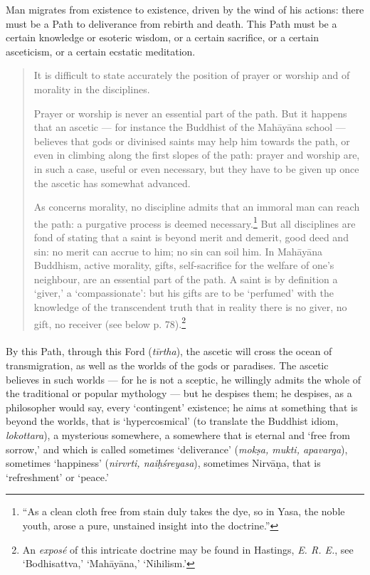 \documentclass[a4paper, 11pt, oneside, english]{article}
\begin{document}
Man migrates from existence to existence, driven by the wind of his actions: there must be a Path to deliverance from rebirth and death. This Path must be a certain knowledge or esoteric wisdom, or a certain sacrifice, or a certain asceticism, or a certain ecstatic meditation.
\begin{quotation}
\small
It is difficult to state accurately the position of prayer or worship and of morality in the disciplines.

Prayer or worship is never an essential part of the path. But it happens that an ascetic --- for instance the Buddhist of the Mahāyāna school --- believes that gods or divinised saints may help him towards the path, or even in climbing along the first slopes of the path: prayer and worship are, in such a case, useful or even necessary, but they have to be given up once the ascetic has somewhat advanced.

As concerns morality, no discipline admits that an immoral man can reach the path: a purgative process is deemed necessary.\footnote{``As a clean cloth free from stain duly takes the dye, so in Yasa, the noble youth, arose a pure, unstained insight into the doctrine.''} But all disciplines are fond of stating that a saint is beyond merit and demerit, good deed and sin: no merit can accrue to him; no sin can soil him. In Mahāyāna Buddhism, active morality, gifts, self-sacrifice for the welfare of one's neighbour, are an essential part of the path. A saint is by definition a `giver,' a `compassionate': but his gifts are to be `perfumed' with the knowledge of the transcendent truth that in reality there is no giver, no gift, no receiver (see below p. 78).\footnote{An \emph{exposé} of this intricate doctrine may be found in Hastings, \emph{E. R. E.}, see `Bodhisattva,' `Mahāyāna,' `Nihilism.'}
\end{quotation}
\paragraph{}
By this Path, through this Ford (\emph{tīrtha}), the ascetic will cross the ocean of transmigration, as well as the worlds of the gods or paradises. The ascetic believes in such worlds --- for he is not a sceptic, he willingly admits the whole of the traditional or popular mythology --- but he despises them; he despises, as a philosopher would say, every `contingent' existence; he aims at something that is beyond the worlds, that is `hypercosmical' (to translate the Buddhist idiom, \emph{lokottara}), a mysterious somewhere, a somewhere that is eternal and `free from sorrow,' and which is called sometimes `deliverance' (\emph{mokṣa, mukti, apavarga}), sometimes `happiness' (\emph{nirvrti, naiḥśreyasa}), sometimes Nirvāṇa, that is `refreshment' or `peace.'
\end{document}
